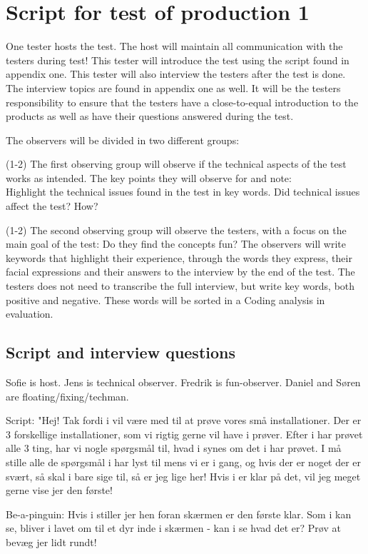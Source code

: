 \section{Script for test of production 1}
One tester hosts the test. The host will maintain all communication with the testers during test!
This tester will introduce the test using the script found in appendix one. This tester will also interview the testers after the test is done. The interview topics are found in appendix one as well. It will be the testers responsibility to ensure that the testers have a close-to-equal introduction to the products as well as have their questions answered during the test. 

The observers will be divided in two different groups:

(1-2) The first observing group will observe if the technical aspects of the test works as intended. The key points they will observe for and note:\\

Highlight the technical issues found in the test in key words.
Did technical issues affect the test? How?

(1-2) The second observing group will observe the testers, with a focus on the main goal of the test: Do they find the concepts fun?
The observers will write keywords that highlight their experience, through the words they express, their facial expressions and their answers to the interview by the end of the test. The testers does not need to transcribe the full interview, but write key words, both positive and negative. These words will be sorted in a Coding analysis in evaluation.

\subsection{Script and interview questions}
Sofie is host.
Jens is technical observer.
Fredrik is fun-observer.
Daniel and Søren are floating/fixing/techman.

Script:
"Hej! Tak fordi i vil være med til at prøve vores små installationer. Der er 3 forskellige installationer, som vi rigtig gerne vil have i prøver. Efter i har prøvet alle 3 ting, har vi nogle spørgsmål til, hvad i synes om det i har prøvet. I må stille alle de spørgsmål i har lyst til mens vi er i gang, og hvis der er noget der er svært, så skal i bare sige til, så er jeg lige her! Hvis i er klar på det, vil jeg meget gerne vise jer den første!

Be-a-pinguin:
Hvis i stiller jer hen foran skærmen er den første klar. Som i kan se, bliver i lavet om til et dyr inde i skærmen - kan i se hvad det er? Prøv at bevæg jer lidt rundt!

